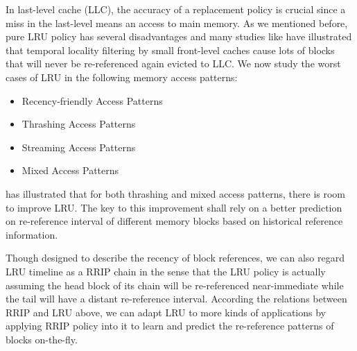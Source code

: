 \documentclass[conference]{IEEEtran}
\begin{document}
In last-level cache (LLC), the accuracy of a replacement policy is crucial since a miss in the last-level means an access to main memory. As we mentioned before, pure LRU policy has several disadvantages and many studies like \cite{kaxiras2001cache} \cite{lai2001dead} \cite{qureshi2007adaptive} \cite{xie2009pipp} have illustrated that temporal locality filtering by small front-level caches cause lots of blocks that will never be re-referenced again evicted to LLC. We now study the worst cases of LRU in the following memory access patterns:
\begin{itemize}
	\item Recency-friendly Access Patterns
	\item Thrashing Access Patterns
	\item Streaming Access Patterns
	\item Mixed Access Patterns
\end{itemize} 
\cite{jaleel2010high} has illustrated that for both thrashing and mixed access patterns, there is room to improve LRU. The key to this improvement shall rely on a better prediction on re-reference interval of different memory blocks based on historical reference information.

Though designed to describe the recency of block references, we can also regard LRU timeline as a RRIP chain in the sense that the LRU policy is actually assuming the head block of its chain will be re-referenced near-immediate while the tail will have a distant re-reference interval. According the relations between RRIP and LRU above, we can adapt LRU to more kinds of applications by applying RRIP policy into it to learn and predict the re-reference patterns of blocks on-the-fly.
\end{document}
